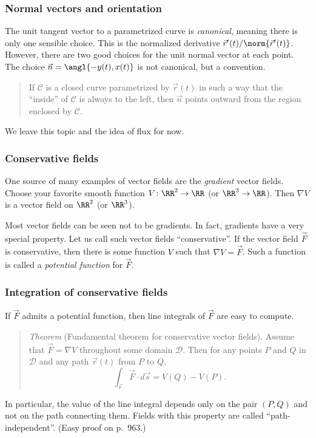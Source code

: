 \documentclass[11pt,ignorenonframetext,aspectratio=169,xcolor={svgnames}]{beamer}
\begin{document}
\begin{frame}\frametitle{Normal vectors and orientation}

The unit tangent vector to a parametrized curve is \emph{canonical},
meaning there is only one sensible choice. This is the normalized
derivative $\vec{r}'(t)/\norm{\vec{r}'(t)}$. However, there are two good
choices for the unit normal vector at each point. The choice
$\vec{n} = \angl{-y(t), x(t)}$ is not canonical, but a convention.

\begin{quote}
If $\mathcal{C}$ is a closed curve parametrized by $\vec{r}(t)$ in such
a way that the ``inside'' of $\mathcal{C}$ is always to the left, then
$\vec{n}$ points outward from the region enclosed by $\mathcal{C}$.
\end{quote}

We leave this topic and the idea of flux for now.

\end{frame}

\begin{frame}\frametitle{Conservative fields}

One source of many examples of vector fields are the \emph{gradient}
vector fields. Choose your favorite smooth function
$V \colon \RR^2 \to \RR$ (or $\RR^3 \to \RR$). Then $\nabla V$ is a vector
field on $\RR^2$ (or $\RR^3$).

Most vector fields can be seen not to be gradients. In fact, gradients
have a very special property. Let us call such vector fields
``conservative''. If the vector field $\vec{F}$ is conservative, then
there is some function $V$ such that $\nabla V = \vec{F}$. Such a
function is called a \emph{potential function} for $\vec{F}$.

\end{frame}

\begin{frame}\frametitle{Integration of conservative fields}

If $\vec{F}$ admits a potential function, then line integrals of
$\vec{F}$ are easy to compute.

\begin{quote}
\emph{Theorem} (Fundamental theorem for conservative vector fields).
Assume that $\vec{F} = \nabla V$ throughout some domain $\mathcal{D}$.
Then for any points $P$ and $Q$ in $\mathcal{D}$ and any path
$\vec{r}(t)$ from $P$ to $Q$,
\[\int_{\vec{r}} \vec{F} \cdot d\vec{s} = V(Q) - V(P).\]
\end{quote}

In particular, the value of the line integral depends only on the pair
$(P,Q)$ and not on the path connecting them. Fields with this property
are called ``path-independent''. (Easy proof on p.~963.)

\end{frame}
\end{document}
